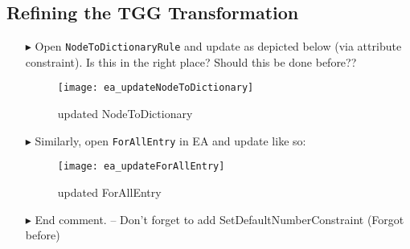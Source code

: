 \newpage
\hypertarget{m2tvis}{}
\subsection{Refining the TGG Transformation}
\visHeader

\begin{itemize}

\item[$\blacktriangleright$] Open \texttt{NodeToDictionaryRule} and update as depicted below (via attribute constraint). Is this in the right place? Should this
be done before??

\begin{figure}[htp]
\begin{center}
  \texttt{[image: ea\_updateNodeToDictionary]}
  \caption{updated NodeToDictionary}
  \label{ea:NodeToDictionary_updated}
\end{center}
\end{figure}

\item[$\blacktriangleright$] Similarly, open \texttt{ForAllEntry} in EA and update like so:

\begin{figure}[htp]
\begin{center}
  \texttt{[image: ea\_updateForAllEntry]}
  \caption{updated ForAllEntry}
  \label{ea:ForAllEntry_updated}
\end{center}
\end{figure}

\item[$\blacktriangleright$] End comment. -- Don't forget to add SetDefaultNumberConstraint (Forgot before)


\end{itemize}
